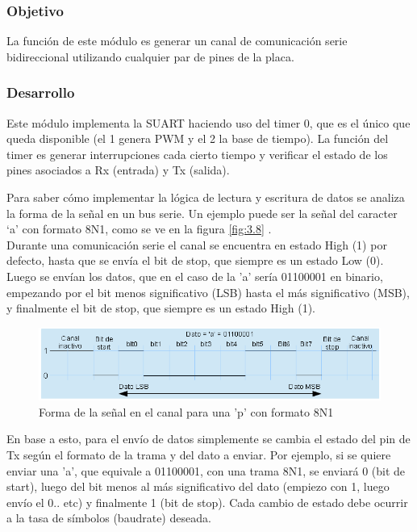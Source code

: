 \subsubsection{Objetivo}
La función de este módulo es generar un canal de comunicación serie bidireccional utilizando cualquier par de pines de la placa.

\subsubsection{Desarrollo}
Este módulo implementa la SUART haciendo uso del timer 0, que es el único que queda disponible (el 1 genera PWM y el 2 la base de tiempo). La función del timer es generar interrupciones cada cierto tiempo y verificar el estado de los pines asociados a Rx (entrada) y Tx (salida). 

Para saber cómo implementar la lógica de lectura y escritura de datos se analiza la forma de la señal en un bus serie. Un ejemplo puede ser la señal del caracter \lq a' con formato 8N1, como se ve en la figura  \ref{fig:3.8} . \\
Durante una comunicación serie el canal se encuentra en estado High (1) por defecto, hasta que se envía el bit de stop, que siempre es un estado Low (0). Luego se envían los datos, que en el caso de la 'a' sería 01100001 en binario, empezando por el bit menos significativo (LSB) hasta el más significativo (MSB), y finalmente el bit de stop, que siempre es un estado High (1). \\

\begin{figure}[!ht]
	\centering
	\includegraphics[width=16cm,scale=1]{resources/3_8-datoSerie.png}
	\caption{Forma de la señal en el canal para una 'p' con formato 8N1}
	\label{fig:\thefigure}
\end{figure}


En base a esto, para el envío de datos simplemente se cambia el estado del pin de Tx según el formato de la trama y del dato a enviar. Por ejemplo, si se quiere enviar una 'a', que equivale a 01100001, con una trama 8N1, se enviará 0 (bit de start), luego del bit menos al más significativo del dato (empiezo con 1, luego envío el 0.. etc) y finalmente 1 (bit de stop). Cada cambio de estado debe ocurrir a la tasa de símbolos (baudrate) deseada.

